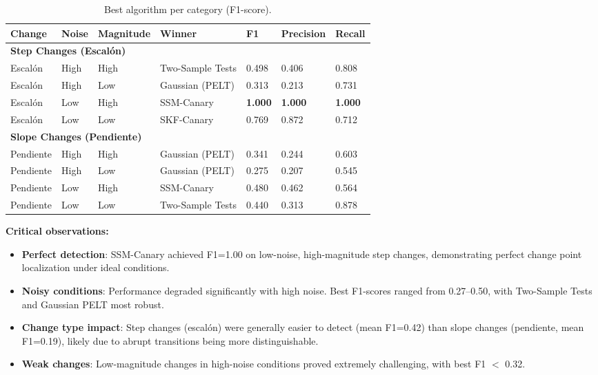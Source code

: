 \begin{table}[H]
\caption{Best algorithm per category (F1-score).\label{tab:best_by_category}}
\begin{tabularx}{\textwidth}{llllXXX}
\toprule
\textbf{Change} & \textbf{Noise} & \textbf{Magnitude} & \textbf{Winner} & \textbf{F1} & \textbf{Precision} & \textbf{Recall} \\
\midrule
\multicolumn{7}{l}{\textbf{Step Changes (Escalón)}} \\
\midrule
Escalón & High & High & Two-Sample Tests & 0.498 & 0.406 & 0.808 \\
Escalón & High & Low & Gaussian (PELT) & 0.313 & 0.213 & 0.731 \\
Escalón & Low & High & SSM-Canary & \textbf{1.000} & \textbf{1.000} & \textbf{1.000} \\
Escalón & Low & Low & SKF-Canary & 0.769 & 0.872 & 0.712 \\
\midrule
\multicolumn{7}{l}{\textbf{Slope Changes (Pendiente)}} \\
\midrule
Pendiente & High & High & Gaussian (PELT) & 0.341 & 0.244 & 0.603 \\
Pendiente & High & Low & Gaussian (PELT) & 0.275 & 0.207 & 0.545 \\
Pendiente & Low & High & SSM-Canary & 0.480 & 0.462 & 0.564 \\
Pendiente & Low & Low & Two-Sample Tests & 0.440 & 0.313 & 0.878 \\
\bottomrule
\end{tabularx}
\end{table}

\textbf{Critical observations:}
\begin{itemize}
    \item \textbf{Perfect detection}: SSM-Canary achieved F1=1.00 on low-noise, high-magnitude step changes, demonstrating perfect change point localization under ideal conditions.
    \item \textbf{Noisy conditions}: Performance degraded significantly with high noise. Best F1-scores ranged from 0.27--0.50, with Two-Sample Tests and Gaussian PELT most robust.
    \item \textbf{Change type impact}: Step changes (escalón) were generally easier to detect (mean F1=0.42) than slope changes (pendiente, mean F1=0.19), likely due to abrupt transitions being more distinguishable.
    \item \textbf{Weak changes}: Low-magnitude changes in high-noise conditions proved extremely challenging, with best F1 $<$ 0.32.
\end{itemize}


